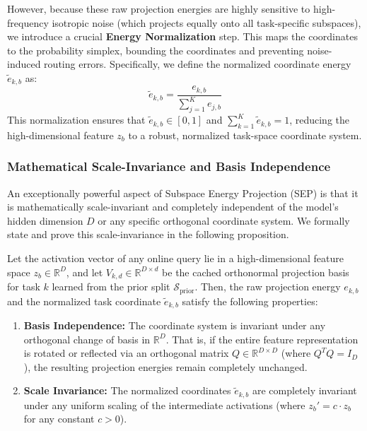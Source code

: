 However, because these raw projection energies are highly sensitive to high-frequency isotropic noise (which projects equally onto all task-specific subspaces), we introduce a crucial \textbf{Energy Normalization} step. This maps the coordinates to the probability simplex, bounding the coordinates and preventing noise-induced routing errors. Specifically, we define the normalized coordinate energy $\tilde{e}_{k, b}$ as:
\begin{equation}
  \tilde{e}_{k, b} = \frac{e_{k, b}}{\sum_{j=1}^K e_{j, b}}
  \label{eq:normalized_energy}
\end{equation}
This normalization ensures that $\tilde{e}_{k, b} \in [0, 1]$ and $\sum_{k=1}^K \tilde{e}_{k, b} = 1$, reducing the high-dimensional feature $z_b$ to a robust, normalized task-space coordinate system.

\subsubsection{Mathematical Scale-Invariance and Basis Independence}
An exceptionally powerful aspect of Subspace Energy Projection (SEP) is that it is mathematically scale-invariant and completely independent of the model's hidden dimension $D$ or any specific orthogonal coordinate system. We formally state and prove this scale-invariance in the following proposition.

\begin{proposition}
Let the activation vector of any online query lie in a high-dimensional feature space $z_b \in \mathbb{R}^D$, and let $V_{k, d} \in \mathbb{R}^{D \times d}$ be the cached orthonormal projection basis for task $k$ learned from the prior split $\mathcal{S}_{\text{prior}}$. Then, the raw projection energy $e_{k, b}$ and the normalized task coordinate $\tilde{e}_{k, b}$ satisfy the following properties:
\begin{enumerate}
    \item \textbf{Basis Independence:} The coordinate system is invariant under any orthogonal change of basis in $\mathbb{R}^D$. That is, if the entire feature representation is rotated or reflected via an orthogonal matrix $Q \in \mathbb{R}^{D \times D}$ (where $Q^T Q = I_D$), the resulting projection energies remain completely unchanged.
    \item \textbf{Scale Invariance:} The normalized coordinates $\tilde{e}_{k, b}$ are completely invariant under any uniform scaling of the intermediate activations (where $z_b' = c \cdot z_b$ for any constant $c > 0$).
\end{enumerate}
\label{prop:scale_invariance}
\end{proposition}

